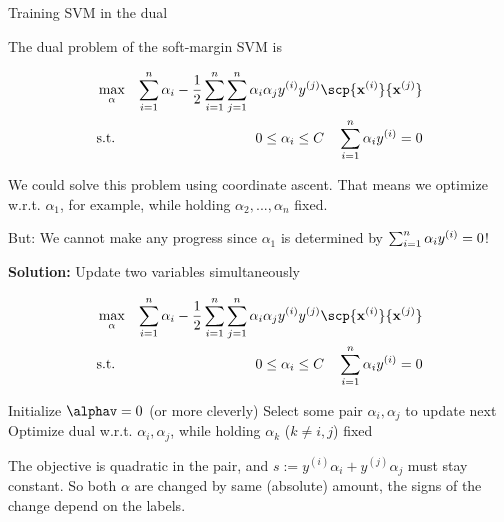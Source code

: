 \documentclass[11pt,compress,t,notes=noshow, xcolor=table]{beamer}
\begin{document}
\begin{vbframe}{Training SVM in the dual}

The dual problem of the soft-margin SVM is

\begin{eqnarray*}
    & \max_{\alpha} & \sum_{i=1}^n \alpha_i - \frac{1}{2}\sum_{i=1}^n\sum_{j=1}^n\alpha_i\alpha_j\yi y^{(j)} \scp{\xi}{\xv^{(j)}}  \\
    & \text{s.t. } & 0 \le \alpha_i \le C \quad \sum_{i=1}^n \alpha_i \yi = 0
\end{eqnarray*}

We could solve this problem using coordinate ascent. That means we optimize w.r.t. $\alpha_1$, for example, while holding $\alpha_2, ..., \alpha_n$ fixed.

\lz

But: We cannot make any progress since $\alpha_1$ is determined by $\sum_{i=1}^n \alpha_i y^{(i)} = 0$!

\framebreak
\textbf{Solution:} Update two variables simultaneously
\vspace{-0.2cm}
\begin{footnotesize}  
\begin{eqnarray*}
    & \max_{\alpha} & \sum_{i=1}^n \alpha_i - \frac{1}{2}\sum_{i=1}^n\sum_{j=1}^n\alpha_i\alpha_j\yi y^{(j)} \scp{\xi}{\xv^{(j)}}  \\
    &  \text{s.t. } & 0 \le \alpha_i \le C \quad \sum_{i=1}^n \alpha_i \yi = 0
\end{eqnarray*}
\end{footnotesize}  
\vspace{-0.6cm}
\begin{algorithm}[H]
  \caption*{\small Pairwise coordinate ascent in the dual}
  \begin{algorithmic}[1]
    \State Initialize $\alphav = 0$ (or more cleverly)
      \State Select some pair $\alpha_i, \alpha_j$ to update next
      \State Optimize dual w.r.t. $\alpha_i, \alpha_j$, while holding $\alpha_k$ ($k\ne i, j$) fixed
      \EndFor
  \end{algorithmic}
\end{algorithm}
\small
The objective is quadratic in the pair, and $s:=y^{(i)}\alpha_i  + y^{(j)}\alpha_j$ must stay constant.
So both $\alpha$ are changed by same (absolute) amount, the signs of the change depend on the labels.


\end{vbframe}
\end{document}
